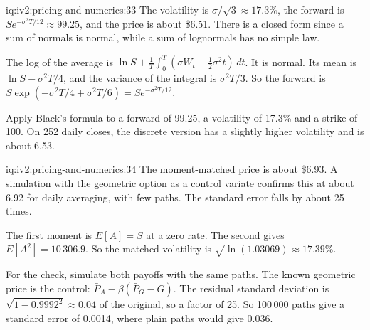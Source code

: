 \begin{solution}{iq:iv2:pricing-and-numerics:33}
The volatility is $\sigma/\sqrt 3 \approx 17.3\%$, the forward is $Se^{-\sigma^2T/12} \approx 99.25$, and the price is about \$6.51. There is a closed form since a sum of normals is normal, while a sum of lognormals has no simple law.

The log of the average is $\ln S + \frac1T\int_0^T(\sigma W_t - \tfrac12\sigma^2t)\,dt$. It is normal. Its mean is $\ln S - \sigma^2T/4$, and the variance of the integral is $\sigma^2T/3$. So the forward is $S\exp(-\sigma^2T/4 + \sigma^2T/6) = Se^{-\sigma^2T/12}$.

Apply Black's formula to a forward of 99.25, a volatility of 17.3\% and a strike of 100. On 252 daily closes, the discrete version has a slightly higher volatility and is about 6.53.

\end{solution}

\begin{solution}{iq:iv2:pricing-and-numerics:34}
The moment-matched price is about \$6.93. A simulation with the geometric option as a control variate confirms this at about 6.92 for daily averaging, with few paths. The standard error falls by about 25 times.

The first moment is $E[A] = S$ at a zero rate. The second gives $E[A^2] = 10\,306.9$. So the matched volatility is $\sqrt{\ln(1.03069)} \approx 17.39\%$.

For the check, simulate both payoffs with the same paths. The known geometric price is the control: $\bar P_A - \beta(\bar P_G - G)$. The residual standard deviation is $\sqrt{1 - 0.9992^2} \approx 0.04$ of the original, so a factor of 25. So 100\,000 paths give a standard error of 0.0014, where plain paths would give 0.036.

\end{solution}

